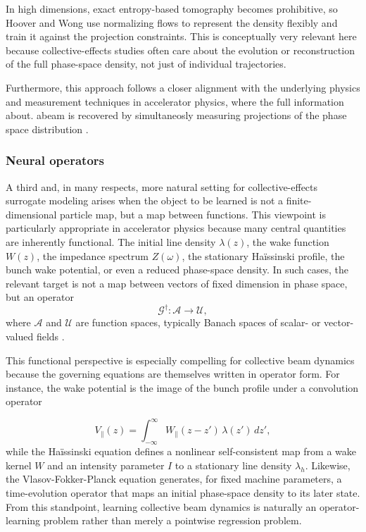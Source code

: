\documentclass[11pt,a4paper]{article}
\begin{document}
\begin{sloppypar}
In high dimensions, exact entropy-based tomography becomes prohibitive, so Hoover and Wong use normalizing flows to represent the density flexibly and train it against the projection constraints. This is conceptually very relevant here because collective-effects studies often care about the evolution or reconstruction of the full phase-space density, not just of individual trajectories. 

Furthermore, this approach follows a closer alignment with the underlying physics and measurement techniques in accelerator physics, where the full information about. abeam is recovered by simultaneosly measuring projections of the phase space distribution \cite{hoover_high-dimensional_2024}.

\subsubsection{Neural operators}

A third and, in many respects, more natural setting for collective-effects surrogate modeling arises when the object to be learned is not a finite-dimensional particle map, but a map between functions. This viewpoint is particularly appropriate in accelerator physics because many central quantities are inherently functional. The initial line density \(\lambda(z)\), the wake function \(W(z)\), the impedance spectrum \(Z(\omega)\), the stationary Ha\"issinski profile, the bunch wake potential, or even a reduced phase-space density. In such cases, the relevant target is not a map between vectors of fixed dimension in phase space, but an operator
\begin{equation}
\mathcal G^\dagger : \mathcal A \to \mathcal U,
\label{eq:NO_operator_target}
\end{equation}
where \(\mathcal A\) and \(\mathcal U\) are function spaces, typically Banach spaces of scalar- or vector-valued fields \cite{kovachki_neural_nodate,kossaifi_library_2026}.

This functional perspective is especially compelling for collective beam dynamics because the governing equations are themselves written in operator form. For instance, the wake potential is the image of the bunch profile under a convolution operator

\begin{equation}
V_{\parallel}(z)
=
\int_{-\infty}^{\infty} W_{\parallel}(z-z')\,\lambda(z')\,dz',
\label{eq:NO_wake_conv}
\end{equation}
while the Ha\"issinski equation defines a nonlinear self-consistent map from a wake kernel \(W\) and an intensity parameter \(I\) to a stationary line density \(\lambda_h\). Likewise, the Vlasov-Fokker-Planck equation generates, for fixed machine parameters, a time-evolution operator that maps an initial phase-space density to its later state. From this standpoint, learning collective beam dynamics is naturally an operator-learning problem rather than merely a pointwise regression problem.


\end{sloppypar}
\end{document}
